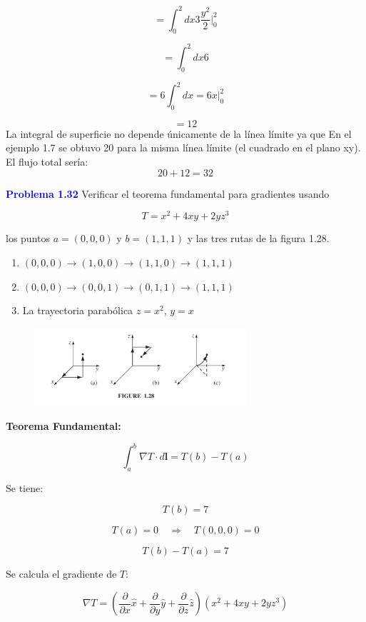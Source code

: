 \documentclass{article}
\newcommand{\question}[1]{\textcolor{blue}{\textbf{#1}}}
\begin{document}
\[
= \int_0^2 dx 3  \frac{y^2}{2}\Big|_0^2

\]

\[
= \int_0^2 dx 6
\]

\[
= 6 \int_0^2 dx = 6 x \Big|_0^2
\]

\[
\boxed{= 12}
\]
La integral de superficie no depende únicamente de la línea límite ya que En el ejemplo 1.7 se obtuvo 20 para la misma línea límite (el cuadrado en el plano xy).
 El flujo total sería: \[
    20 + 12 = \boxed{32}   \]

\question{Problema  1.32} Verificar el teorema fundamental para gradientes usando 

\[
T = x^2 + 4xy + 2y z^3
\]

los puntos \( a = (0,0,0) \) y \( b = (1,1,1) \) y las tres rutas de la figura 1.28.

\begin{enumerate}
    \item \( (0,0,0) \to (1,0,0) \to (1,1,0) \to (1,1,1) \)
    \item \( (0,0,0) \to (0,0,1) \to (0,1,1) \to (1,1,1) \)
    \item La trayectoria parabólica \( z = x^2 \), \( y = x \)
\end{enumerate}

\begin{figure}[h] 
    \centering
    \includegraphics[width=0.7\textwidth]{1.28.jpg} 
    \label{fig:mi_figura}
\end{figure}


\textbf{Teorema Fundamental:}

\[
\int_a^b \nabla T \cdot d\mathbf{l} = T(b) - T(a)
\]

Se tiene:

\[
T(b) = 7
\]

\[
T(a) = 0 \quad \Rightarrow \quad T(0,0,0) = 0
\]

\[
\boxed{T(b) - T(a) = 7}
\]

Se calcula el gradiente de \( T \):

\[
\nabla T = \left( \frac{\partial}{\partial x} \hat{x} + \frac{\partial}{\partial y} \hat{y} + \frac{\partial}{\partial z} \hat{z} \right) (x^2 + 4xy + 2y z^3)
\]
\end{document}
